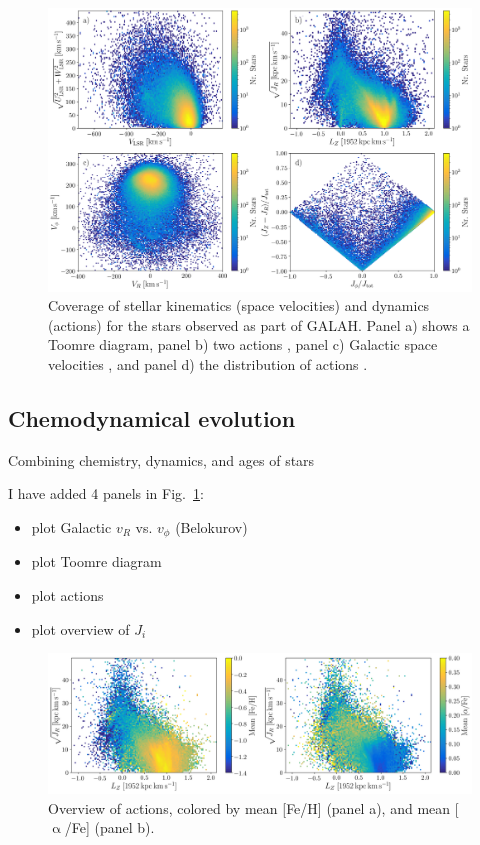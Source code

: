 \documentclass[fleqn,usenatbib,useAMS]{mnras}
\begin{document}
\begin{figure}
\centering
\includegraphics[width=\textwidth]{figures/DR3_dynamics_overview.png}
  \caption{Coverage of stellar kinematics (space velocities) and dynamics (actions) for the stars observed as part of GALAH. Panel a) shows a Toomre diagram\citep[compare to e.g.][]{Bonaca2017}, panel b) two actions \citep[compare to e.g.][]{Trick2019}, panel c) Galactic space velocities \citep[compare to e.g.][]{Belokurov2018}, and panel d) the distribution of actions \citep[compare to e.g.][]{Vasiliev2019}.}
  \label{fig:DR3_dynamics_overview}
\end{figure}

\subsection{Chemodynamical evolution}  \label{sec:cde}

Combining chemistry, dynamics, and ages of stars

I have added 4 panels in Fig.~\ref{fig:DR3_dynamics_overview}:
\begin{itemize}
\item plot Galactic $v_R$ vs. $v_\phi$ (Belokurov)
\item plot Toomre diagram
\item plot actions
\item plot \cite{Vasiliev2019} overview of $J_i$
\end{itemize}

\begin{figure}
\centering
\includegraphics[width=\textwidth]{figures/DR3_action_xfe.png}
  \caption{Overview of actions, colored by mean [Fe/H] (panel a), and mean [$\upalpha$/Fe] (panel b).}
  \label{fig:DR3_action_xfe}
\end{figure}
\end{document}
